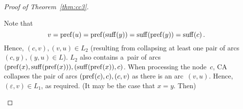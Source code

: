 \begin{proof}[Proof of Theorem~\ref{thm:cc3}]
\begin{description}
Note that 
\[v = \operatorname{pref}(u)=\operatorname{pref}(\operatorname{suff}(y))=\operatorname{suff}(\operatorname{pref}(y))=\operatorname{suff}(c) \, .\]
Hence, $(c,v), (v,u) \in L_2$ (resulting from collapsing at least one pair of arcs $(c,y), (y,u) \in L$). $L_2$ also contains a~pair of arcs $(\operatorname{pref}(x), \operatorname{suff}(\operatorname{pref}(x))), (\operatorname{suff}(\operatorname{pref}(x)), c)$. When processing the node~$c$, CA collapses the pair of arcs $(\operatorname{pref}(c), c), (c, v)$ as there is an arc~$(v,u)$.
Hence, $(\varepsilon, v) \in L_1$, as required. (It may be the case that $x=y$. Then)


\end{description}





\end{proof}

